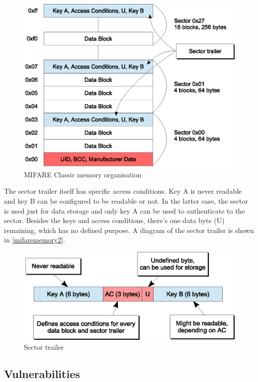 \documentclass[12pt,a4paper,twoside,openright]{report}
\begin{document}
\begin{figure}[tbh]
\centerline{\includegraphics{figures/mifarememory1.eps}}
\caption{MIFARE Classic memory organisation}
\label{mifarememory1}
\end{figure}

The sector trailer itself has specific access conditions. Key A is never readable and key B can be configured to be readable or not. In the latter case, the sector is used just for data storage and only key A can be used to authenticate to the sector. Besides the keys and access conditions, there's one data byte (U) remaining, which has no defined purpose. A diagram of the sector trailer is shown in \autoref{mifarememory2}.

\begin{figure}[tbh]
\centerline{\includegraphics{figures/mifarememory2.eps}}
\caption{Sector trailer}
\label{mifarememory2}
\end{figure}

\subsection{Vulnerabilities}
\end{document}
